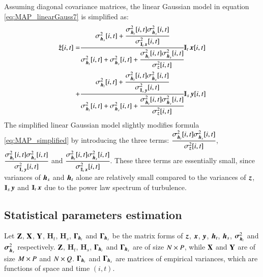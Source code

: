 Assuming diagonal covariance matrices, the linear Gaussian model in equation \ref{eq:MAP_linearGauss7} is simplified as:
\begin{equation}
	\begin{split}
	\hat{\z }[i,t] =& \cfrac{\sigma^2_{\h_s}[i,t]+\cfrac{\sigma^2_{\h_t}[i,t]\sigma^2_{\h_s}[i,t]}{\sigma^2_{\Interp_t\x }[i,t]}}{\sigma^2_{\h_t}[i,t]+\sigma^2_{\h_s}[i,t]
	+ \cfrac{\sigma^2_{\h_t}[i,t]\sigma^2_{\h_s}[i,t]}{\sigma^2_{\z }[i,t]}}\Interp_t\x [i,t] \\
	+& \cfrac{\sigma^2_{\h_t}[i,t] +\cfrac{\sigma^2_{\h_t}[i,t]\sigma^2_{\h_s}[i,t]}{\sigma^2_{\Interp_s\y }[i,t]}}{\sigma^2_{\h_t}[i,t]+\sigma^2_{\h_s}[i,t]+\cfrac{\sigma^2_{\h_t}[i,t]\sigma^2_{\h_s}[i,t]}{\sigma^2_{\z }[i,t]}}\Interp_s\y [i,t]
	\end{split}	
	\label{eq:LinearGauss_simplified}	
\end{equation} 
The simplified linear Gaussian model slightly modifies formula \ref{eq:MAP_simplified} by introducing the three terms: $ \cfrac{\sigma^2_{\operatorname{\boldsymbol{h}}_t}[i,t]\sigma^2_{\operatorname{\boldsymbol{h}}_s}[i,t]}{\sigma^2_{\operatorname{\boldsymbol{z}} }[i,t]} $, $ \cfrac{\sigma^2_{\h_t}[i,t]\sigma^2_{\h_s}[i,t]}{\sigma^2_{\Interp_s\y }[i,t]} $ and $ \cfrac{\sigma^2_{\h_t}[i,t]\sigma^2_{\h_s}[i,t]}{\sigma^2_{\Interp_t\x }[i,t]} $. These three terms are essentially small, since variances of $ \operatorname{\boldsymbol{h}}_s $ and $ \operatorname{\boldsymbol{h}}_t $ alone are relatively small compared to the variances of $ \operatorname{\boldsymbol{z}} $, $ \Interp_s\y $ and $ \Interp_t\x $ due to the power law spectrum of turbulence.

\subsection{\label{subsec:statistical_parameters_estimation} Statistical parameters estimation}
Let $\mathbf{Z}$, $ \mathbf{X} $, $ \mathbf{Y} $, $ \mathbf{H}_t $, $ \mathbf{H}_s $, $ \mathbf{\Gamma}_{\operatorname{\boldsymbol{h}}_t} $ and $ \mathbf{\Gamma}_{\operatorname{\boldsymbol{h}}_s} $ be the matrix forms of $ \operatorname{\boldsymbol{z}}  $, $ \operatorname{\boldsymbol{x}}  $, $ \operatorname{\boldsymbol{y}}  $, $ \operatorname{\boldsymbol{h}}_t $, $ \operatorname{\boldsymbol{h}}_s $, $\operatorname{\boldsymbol{\sigma}}^2_{\operatorname{\boldsymbol{h}}_t} $ and $\operatorname{\boldsymbol{\sigma}}^2_{\operatorname{\boldsymbol{h}}_s} $ respectively.  $\mathbf{Z}$, $ \mathbf{H}_t $, $ \mathbf{H}_s $, $ \mathbf{\Gamma}_{\operatorname{\boldsymbol{h}}_t} $ and $ \mathbf{\Gamma}_{\operatorname{\boldsymbol{h}}_s} $ are of size $ N\times P $, while $ \mathbf{X} $ and $ \mathbf{Y} $ are of size $ M \times P $ and $ N\times Q $. $ \mathbf{\Gamma}_{\operatorname{\boldsymbol{h}}_t} $ and $ \mathbf{\Gamma}_{\operatorname{\boldsymbol{h}}_s} $ are matrices of empirical variances, which are functions of space and time $ (i,t) $. 

